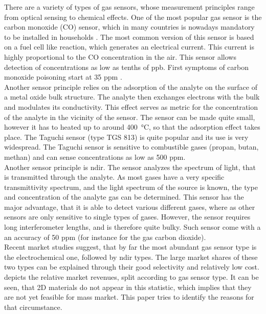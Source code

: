 There are a variety of types of gas sensors, whose measurement principles range from optical sensing to chemical effects. One of the most popular gas sensor is the carbon monoxide (CO) sensor, which in many countries is nowadays mandatory to be installed in households \cite{ncsl2018}. The most common version of this sensor is based on a fuel cell like reaction, which generates an electrical current. This current is highly proportional to the CO concentration in the air. This sensor allows detection of concentrations as low as tenths of ppb. First symptoms of carbon monoxide poisoning start at 35 ppm \cite{Goldstein2008}. \\
Another sensor principle relies on the adsorption of the analyte on the surface of a metal oxide bulk structure. The analyte then exchanges electrons with the bulk and modulates its conductivity. This effect serves as metric for the concentration of the analyte in the vicinity of the sensor. The sensor can be made quite small, however it has to heated up to around \SI{400}{\celsius}, so that the adsorption effect takes place. The Taguchi sensor (type TGS 813) \cite{Yamauchi2012, Hartman2021}  is quite popular and its use is very widespread. The Taguchi sensor is sensitive to combustible gases (propan, butan, methan) and can sense concentrations as low as 500 ppm. \\
Another sensor principle is \gls{ndir}. The sensor analyzes the spectrum of light, that is transmitted through the analyte. As most gases have a very specific transmittivity spectrum, and the light spectrum of the source is known, the type and concentration of the analyte gas can be determined. This sensor has the major advantage, that it is able to detect various different gases, where as other sensors are only sensitive to single types of gases. However, the sensor requires long interferometer lengths, and is therefore quite bulky. Such sensor come with a an accuracy of 50 ppm \cite{lp8} (for instance for the gas carbon dioxide). \\
Recent market studies\cite{yole2021, Buckley2020} suggest, that by far the most abundant gas sensor type is the electrochemical one, followed by \gls{ndir} types. The large market shares of these two types can be explained through their good selectivity and relatively low cost.  depicts the relative market revenues, split according to gas sensor type. It can be seen, that 2D materials do not appear in this statistic, which implies that they are not yet feasible for mass market. This paper tries to identify the reasons for that circumstance. \\
